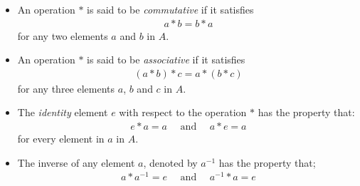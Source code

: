 \documentclass[nohyper,nobib]{tufte-handout}
\begin{document}
\begin{defns}
    \begin{itemize}
        \item An operation $*$ is said to be \emph{commutative} if it satisfies
            \begin{align}
                a * b  = b * a
            \end{align}
            for any two elements $a$ and $b$ in $A$.
        \item An operation $*$ is said to be \emph{associative} if it satisfies 
            \begin{align}
                (a * b) * c = a * (b * c)
            \end{align}
            for any three elements $a$, $b$ and $c$ in $A$.
        \item The \emph{identity} element $e$ with respect to the operation $*$ has the property that:
            \begin{align}
                e * a  = a \quad\text{ and }\quad a * e = a
            \end{align}
            for every element in $a$ in $A$.
        \item The inverse of any element $a$, denoted by $a^{-1}$ has the property that;
            \begin{align}
                a * a^{-1} = e  \quad\text{ and }\quad a^{-1} * a = e
            \end{align}
    \end{itemize}
\end{defns}
\end{document}
